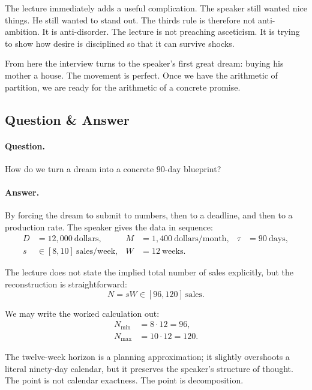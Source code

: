 The lecture immediately adds a useful complication. The speaker still wanted nice things. He still wanted to stand out. The thirds rule is therefore not anti-ambition. It is anti-disorder. The lecture is not preaching asceticism. It is trying to show how desire is disciplined so that it can survive shocks.

From here the interview turns to the speaker's first great dream: buying his mother a house. The movement is perfect. Once we have the arithmetic of partition, we are ready for the arithmetic of a concrete promise.

\subsection{Question \& Answer}

\paragraph{Question.} How do we turn a dream into a concrete \(90\)-day blueprint?

\paragraph{Answer.} By forcing the dream to submit to numbers, then to a deadline, and then to a production rate. The speaker gives the data in sequence:
\begin{align}
D &= 12{,}000\ \text{dollars}, &
M &= 1{,}400\ \text{dollars/month}, &
\tau &= 90\ \text{days}, \\
s &\in [8,10]\ \text{sales/week}, &
W &= 12\ \text{weeks}. &&
\end{align}

The lecture does not state the implied total number of sales explicitly, but the reconstruction is straightforward:
\begin{equation}
N = sW \in [96,120]\ \text{sales}.
\end{equation}

We may write the worked calculation out:
\begin{align}
N_{\min} &= 8 \cdot 12 = 96,\\
N_{\max} &= 10 \cdot 12 = 120.
\end{align}

The twelve-week horizon is a planning approximation; it slightly overshoots a literal ninety-day calendar, but it preserves the speaker's structure of thought. The point is not calendar exactness. The point is decomposition.

